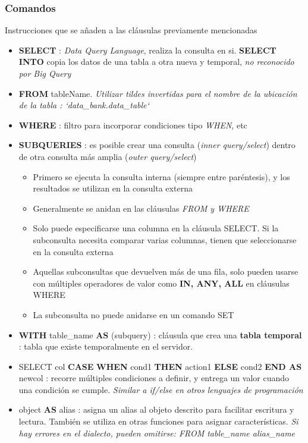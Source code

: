 \subsubsection{Comandos}
Instrucciones que se añaden a las cláusulas previamente mencionadas
\begin{itemize}
    \item {\textbf{SELECT} : \textit{Data Query Language}, realiza la consulta en si. \textbf{SELECT INTO} copia los datos de una tabla a otra nueva y temporal, \textit{no reconocido por Big Query}}
    \item {\textbf{FROM} tableName. \textit{Utilizar tildes invertidas para el nombre de la ubicación de la tabla : `data\_bank.data\_table`}}
    \item {\textbf{WHERE} : filtro para incorporar condiciones tipo \textit{WHEN}, etc}
    \item {\textbf{SUBQUERIES} : es posible crear una consulta (\textit{inner query/select}) dentro de otra consulta más amplia (\textit{outer query/select}) 
    \begin{itemize}
        \item {Primero se ejecuta la consulta interna (siempre entre paréntesis), y los resultados se utilizan en la consulta externa}
        \item {Generalmente se anidan en las cláusulas \textit{FROM y WHERE}}
        \item {Solo puede especificarse una columna en la cláusula SELECT. Si la subconsulta necesita comparar varias columnas, tienen que seleccionarse en la consulta externa}
        \item {Aquellas subconsultas que devuelven más de una fila, solo pueden usarse con múltiples operadores de valor como \textbf{IN, ANY, ALL} en cláusulas WHERE}
        \item {La subconsulta no puede anidarse en un comando SET}
    \end{itemize}}
    \item {\textbf{WITH} table\_name \textbf{AS} (subquery) : cláusula que crea una \textbf{tabla temporal} : tabla que existe temporalmente en el servidor.}
    \item {SELECT col \textbf{CASE} \textbf{WHEN} cond1 \textbf{THEN} action1 \textbf{ELSE} cond2 \textbf{END AS} newcol : recorre múltiples condiciones a definir, y entrega un valor cuando una condición se cumple. \textit{Similar a if/else en otros lenguajes de programación}}
    \item {object \textbf{AS} alias : asigna un alias al objeto descrito para facilitar escritura y lectura. También se utiliza en otras funciones para asignar características. \textit{Si hay errores en el dialecto, pueden omitirse: FROM table\_name alias\_name}}

\end{itemize}
